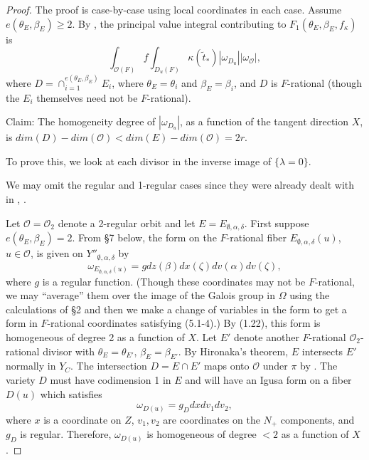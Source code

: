 \documentclass[12pt,letterpaper]{amsart}
\newcommand{\ooo}{\mathcal{O}}
\begin{document}
\begin{proof} The proof is case-by-case using local coordinates in each case.
Assume $e(\theta_E,\beta_E)\geq 2$. By \cite{La83}, the
principal value integral contributing to
$F_1(\theta_E,\beta_E,f_\kappa)$ is
\[
\int_{\ooo(F)}f\int_{D_u(F)}\kappa(\tilde{t}_*)
|\omega_{D_u}||\omega_{\ooo}|,
\]
where $D=\cap_{i=1}^{e(\theta_E,\beta_E)}E_i$,
where $\theta_E=\theta_i$ and $\beta_E=\beta_i$,
and $D$ is $F$-rational (though the $E_i$ themselves need not be
$F$-rational).

Claim: The homogeneity degree of $|\omega_{D_u}|$, as a function
of the tangent direction $X$, is $dim(D)-dim(\ooo)<dim(E)-dim(\ooo)=2r$.

To prove this, we look at each divisor in the inverse image of
$\{\lambda =0\}$.

We may omit the regular and 1-regular cases since they were already
dealt with in \cite{Ha92a}, \cite{LS90}.

Let ${\mathcal O}={\mathcal O}_2$ denote a 2-regular orbit and let
$E=E_{\emptyset, \alpha,\delta}$.
First suppose $e(\theta_E,\beta_E)=2$.
From \S 7 below, the form on the $F$-rational fiber
$E_{\emptyset,\alpha,\delta}(u)$, $u\in {\mathcal O}$, is given
on $Y''_{\emptyset,\alpha,\delta}$ by
\[
\omega_{E_{\emptyset,\alpha,\delta}(u)}
=gdz(\beta)dx(\zeta)dv(\alpha)dv(\zeta),
\tag{5.15}
\]
where $g$ is a regular function.
(Though these coordinates may not be $F$-rational, we
may ``average'' them over the image of the Galois group in $\Omega$
using the calculations of \S 2 and then we make a change
of variables in the form to get a form in $F$-rational coordinates
satisfying (5.1-4).)
By (1.22), this form is homogeneous
of degree 2 as a function of $X$. Let $E'$ denote another
$F$-rational ${\mathcal O}_2$-rational divisor with
$\theta_E=\theta_{E'}$, $\beta_E =\beta_{E'}$. By Hironaka's theorem,
$E$ intersects $E'$ normally in $Y_C$. The intersection $D=E\cap E'$
maps onto ${\mathcal O}$ under $\pi$ by \cite[chap II, Prop 3.1]{DG80}.
The variety $D$ must have codimension 1 in $E$ and will have
an Igusa form on
a fiber $D(u)$ which satisfies
\[
\omega_{D(u)}=g_Ddx dv_1dv_2,
\]
where $x$ is a coordinate on $Z$, $v_1,v_2$ are coordinates on the
$N_+$ components, and $g_D$ is regular. Therefore, $\omega_{D(u)}$
is homogeneous of degree $<2$ as a function of $X$.


\end{proof}
\end{document}
